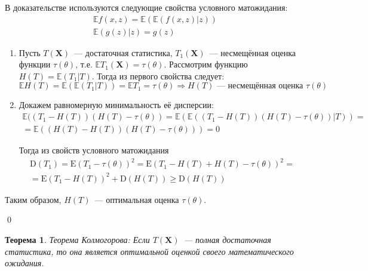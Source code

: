 \documentclass[oneside,final,14pt]{extreport}
\renewenvironment{proof}{{\bfseries Доказательство.}}{\qed}
\newtheorem{thm}{Теорема}[section]
\theoremstyle{definition}
\begin{document}
\begin{proof}
В доказательстве используются следующие свойства условного матожидания: 
\begin{gather*}
    \mathbb{E} f(x, z)=\mathbb{E}(\mathbb{E}(f(x, z) | z)) \\
    \mathbb{E}(g(z) | z)=g(z)
\end{gather*}

\begin{enumerate}
    \item Пусть $T(\mathbf{X})$~--- достаточная статистика, $T_1(\mathbf{X})$~--- несмещённая оценка функции $\tau(\theta)$, т.е. $\mathbb{E} T_{1}(\mathbf{X})=\tau(\theta)$. Рассмотрим функцию $H(T)=\mathbb{E}\left(T_{1} | T\right)$. Тогда из первого свойства следует:
    \begin{equation*}
        \mathbb{E} H(T)=\mathbb{E}\left(\mathbb{E}\left(T_{1} |     T\right)\right)=\mathbb{E} T_{1}=\tau(\theta) \Rightarrow H(T)     \text{~--- несмещённая оценка~} \tau(\theta)
    \end{equation*}

    \item Докажем равномерную минимальность её дисперсии:
    \begin{multline*}
        \mathbb{E}((T_{1}-H(T))(H(T)-\tau(\theta))
        = \mathbb{E}(\mathbb{E}((T_{1}-H(T))(H(T)-\tau(\theta)) | T)) 
        = \\
        = \mathbb{E}((H(T)-H(T))(H(T)-\tau(\theta)))
        = 0
    \end{multline*}

    Тогда из свойств условного матожидания
    \begin{multline*}
        \mathrm{D}\left(T_{1}\right) 
        = \mathrm{E}\left(T_{1}-\tau(\theta)\right)^{2}=\mathrm{E}\left(T_{1}-H(T)+H(T)-\tau(\theta)\right)^{2} =\\
        = \mathrm{E}\left(T_{1}-H(T)\right)^{2}+\mathrm{D}(H(T)) \geqslant \mathrm{D}(H(T))
    \end{multline*}
\end{enumerate}
Таким образом, $H(T)$~--- оптимальная оценка $\tau(\theta)$.

\end{proof}

\begin{thm}
{\it Теорема Колмогорова:} Если $T(\mathbf{X})$~--- полная достаточная статистика, то она является оптимальной оценкой своего математического ожидания.
\end{thm}
\end{document}
